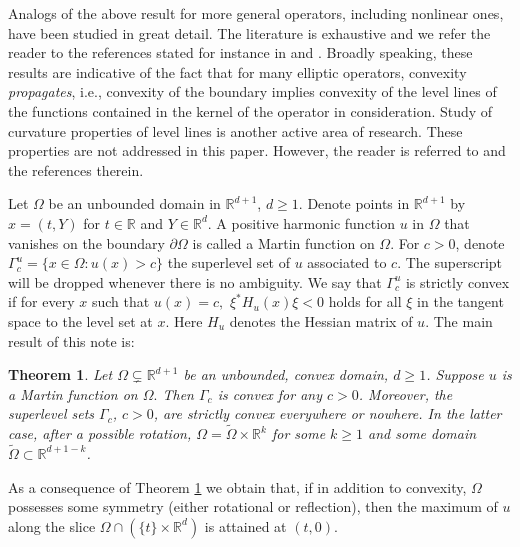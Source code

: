 \documentclass[11pt]{amsart}
\newcommand{\R}{{\mathbb{R}}}
\newtheorem{thm}{Theorem}[section]
\theoremstyle{definition}
\theoremstyle{remark}
\begin{document}
\noindent Analogs of the above result for more general operators, including nonlinear ones, have been studied in great detail. The literature is exhaustive and we refer the reader to the references stated for instance in \cite{CS} and \cite{KO}. Broadly speaking, these results are indicative of the fact that for many elliptic operators, convexity \emph{propagates}, i.e., convexity of the boundary implies convexity of the level lines of the functions contained in the kernel of the operator in consideration. Study of curvature properties of level lines is another active area of research. These properties are not addressed in this paper. However, the reader is referred to \cite{CMY} and the references therein. 

\vspace{0.1in}

 Let $\Omega$ be an unbounded domain in $\mathbb{R}^{d+1}$, $d\geq 1$. Denote points in $\mathbb{R}^{d+1}$ by $x = (t, Y)$ for $t\in\mathbb{R}$ and $Y\in\mathbb{R}^d$. A positive harmonic function $u$ in $\Omega$ that vanishes on the boundary $\partial\Omega$ is called a Martin function on $\Omega$. For $c>0$, denote $\Gamma_c^u = \{x\in\Omega: u(x) > c\}$ the superlevel set of $u$ associated to $c$.  The superscript will be dropped whenever there is no ambiguity. We say that $\Gamma_c^u$ is strictly convex if for every $x$ such that $u(x) = c,$ $\xi^{*}H_u(x)\xi < 0$ holds for all $\xi$ in the tangent space to the level set at $x.$ Here $H_u$ denotes the Hessian matrix of $u.$ The main result of this note is:

\begin{thm}\label{convex}
Let $\Omega\subsetneq\mathbb{R}^{d+1}$ be an unbounded, convex domain, $d\geq 1$. Suppose $u$ is a Martin function on $\Omega.$ Then $\Gamma_c$ is convex for any $c>0$. Moreover, the superlevel sets $\Gamma_c$, $c>0$, are strictly convex everywhere or nowhere.  In the latter case, after a possible rotation, $\Omega = \widetilde{\Omega} \times \R^k$ for some $k \geq 1$ and some domain $\widetilde{\Omega} \subset \R^{d+1-k}$.
\end{thm}

 As a consequence of Theorem \ref{convex} we obtain that, if in addition to convexity, $\Omega$  possesses some symmetry (either rotational or reflection), then the maximum of $u$ along the slice $\Omega\cap\left(\{t\}\times\mathbb{R}^d\right)$ is attained at $(t,0).$
 
\end{document}
